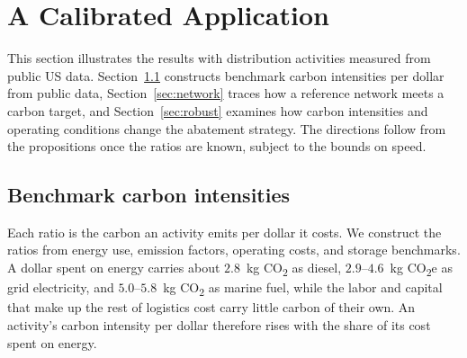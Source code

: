 \documentclass[11pt]{article}
\numberwithin{proposition}{section}
\theoremstyle{definition}
\theoremstyle{remark}
\theoremstyle{plain}
\begin{document}
\section{A Calibrated Application}\label{sec:numerical}

This section illustrates the results with distribution activities measured from public US data.
Section~\ref{sec:calib} constructs benchmark carbon intensities per dollar from public data, Section~\ref{sec:network} traces how a reference network meets a carbon
target, and Section~\ref{sec:robust} examines how carbon intensities and operating conditions change the abatement strategy. The
directions follow from the propositions once the ratios are known, subject to the bounds on speed.

\subsection{Benchmark carbon intensities}\label{sec:calib}

Each ratio is the carbon an activity emits per dollar it costs. We construct the ratios from energy use,
emission factors, operating costs, and storage benchmarks.
A dollar spent on energy carries about $2.8$~kg CO\textsubscript{2} as diesel, $2.9$--$4.6$~kg CO\textsubscript{2}e as grid
electricity, and $5.0$--$5.8$~kg CO\textsubscript{2} as marine fuel, while the labor and capital that make up the rest of logistics
cost carry little carbon of their own. An activity's carbon intensity per dollar therefore rises with the share of
its cost spent on energy.
\end{document}
